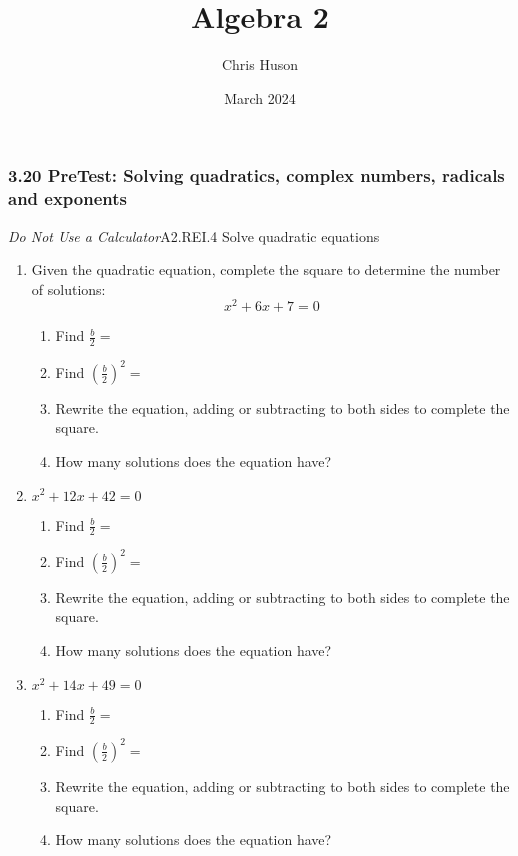 \documentclass[12pt, twoside]{article}
\title{Algebra 2}
\author{Chris Huson}
\date{March 2024}
\begin{document}
\subsubsection*{3.20 PreTest: Solving quadratics, complex numbers, radicals and exponents}
\emph{Do Not Use a Calculator}\hfill A2.REI.4 Solve quadratic equations
\begin{enumerate}
\item Given the quadratic equation, complete the square to determine the number of solutions: $$x^2 + 6x + 7 = 0$$
    \begin{enumerate}
        \item Find $\displaystyle \frac{b}{2}=$
        \item Find $\displaystyle \left( \frac{b}{2} \right)^2=$

        \item Rewrite the equation, adding or subtracting to both sides to complete the square. \vspace{1.5cm}
        \item How many solutions does the equation have? \vspace{0.5cm}
    \end{enumerate}

\item \hspace{5cm} $x^2 + 12x + 42 = 0$
    \begin{enumerate}
        \item Find $\displaystyle \frac{b}{2}=$
        \item Find $\displaystyle \left( \frac{b}{2} \right)^2=$

        \item Rewrite the equation, adding or subtracting to both sides to complete the square. \vspace{1.5cm}
        \item How many solutions does the equation have? \vspace{0.5cm}
    \end{enumerate}

\item \hspace{5cm} $x^2 + 14x + 49 = 0$
    \begin{enumerate}
        \item Find $\displaystyle \frac{b}{2}=$
        \item Find $\displaystyle \left( \frac{b}{2} \right)^2=$

        \item Rewrite the equation, adding or subtracting to both sides to complete the square. \vspace{1.5cm}
        \item How many solutions does the equation have? \vspace{0.5cm}
    \end{enumerate}


\end{enumerate}
\end{document}
